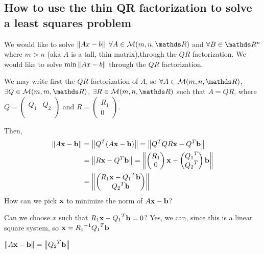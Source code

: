 \documentclass[ComputationalMathematics.tex]{subfiles}
\begin{document}
\subsection{How to use the thin QR factorization to solve a least squares problem}

We would like to solve $\left\lVert Ax-b\right\rVert$ $\forall A \in \mathcal{M}(m, n, \R)$ and $\forall B \in \R^n$ where $m > n$ (aka $A$ is a tall, thin matrix),through the $QR$ factorization.
We would like to solve $\min \left\lVert Ax-b\right\rVert$ through the $QR$ factorization.

We may write first the $QR$ factorization of $A$, so $\forall A \in \mathcal{M}(m, n, \R)$, $\exists Q \in \mathcal{M}(m, m, \R)$, $\exists R \in \mathcal{M}(m, n, \R)$ such that $A = QR$, where 
$Q = \begin{pmatrix}
  &\\
  Q_1 & Q_2\\
  &\\
\end{pmatrix}$ and $R = \begin{pmatrix}
    R_1\\0
\end{pmatrix}$.

Then, 
\begin{equation}
\begin{aligned}
  \left\lVert A\mathbf{x}-\mathbf{b}\right\rVert &= \left\lVert{Q}^{T}(A\mathbf{x}-\mathbf{b})\right\rVert = \left\lVert{Q}^{T}QR\mathbf{x} - {Q}^{T}\mathbf{b}\right\rVert \\
  & = \left\lVert R\mathbf{x}-{Q}^{T}\mathbf{b}\right\rVert = \left\lVert\begin{pmatrix}
    R_1\\0
\end{pmatrix}\mathbf{x} - \begin{pmatrix}
  {Q_{1}}^{T}\\
    {Q_{2}}^{T}
\end{pmatrix}\mathbf{b}\right\rVert\\
&=\left\lVert\begin{pmatrix}
  R_{1} \mathbf{x} - {Q_{1}}^{T} \mathbf{b}\\
    {Q_{2}}^{T}\mathbf{b}
\end{pmatrix}\right\rVert
\end{aligned}
\end{equation}
How can we pick $\mathbf{x}$ to minimize the norm of $A\mathbf{x} - \mathbf{b}$?

Can we choose $x$ such that $R_{1} \mathbf{x} - {Q_{1}}^{T} \mathbf{b} = 0$? Yes, we can, since this is a linear square system, so $\mathbf{x} = {R_{1}}^{-1} {Q_{1}}^{T} \mathbf{b} $

$\left\lVert A\mathbf{x} - \mathbf{b}\right\rVert = \left\lVert{Q_{2}}^{T} \mathbf{b}\right\rVert$
\end{document}
